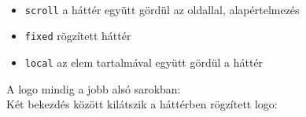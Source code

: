 \begin{frame}
  \begin{exampleblock}{}
    \fontsize{7}{8} \selectfont
    
    
    
    
    
  \end{exampleblock}
\end{frame}

\begin{frame}
  \begin{description}[m]
    \item[\texttt{background-attachment}] \hfill \\
      \begin{itemize}
        \item \texttt{scroll} a háttér együtt gördül az oldallal, 
        alapértelmezés
        \item \texttt{fixed} rögzített háttér
        \item \texttt{local} az elem tartalmával együtt gördül a háttér
      \end{itemize}
      \vfill
      A logo mindig a jobb alsó sarokban: 
      \\
      Két bekezdés között kilátszik a háttérben rögzített logo: 
  \end{description}
\end{frame}
